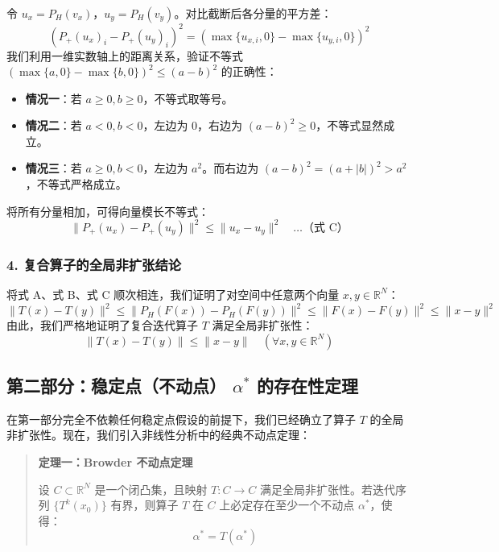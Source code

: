 令 $u_x = P_H(v_x)$，$u_y = P_H(v_y)$。对比截断后各分量的平方差：
\begin{equation}
(P_+(u_x)_i - P_+(u_y)_i)^2 = (\max\{u_{x,i}, 0\} - \max\{u_{y,i}, 0\})^2
\end{equation}
我们利用一维实数轴上的距离关系，验证不等式 $(\max\{a, 0\} - \max\{b, 0\})^2 \leqslant (a - b)^2$ 的正确性：

\begin{itemize}
\item \textbf{情况一}：若 $a \geqslant 0, b \geqslant 0$，不等式取等号。
\item \textbf{情况二}：若 $a < 0, b < 0$，左边为 $0$，右边为 $(a-b)^2 \geqslant 0$，不等式显然成立。
\item \textbf{情况三}：若 $a \geqslant 0, b < 0$，左边为 $a^2$。而右边为 $(a-b)^2 = (a+|b|)^2 > a^2$，不等式严格成立。
\end{itemize}

将所有分量相加，可得向量模长不等式：
\begin{equation}
\boxed{ \|P_+(u_x) - P_+(u_y)\|^2 \leqslant \|u_x - u_y\|^2 } \quad \dots \text{（式 C）}
\end{equation}

\subsubsection{4. 复合算子的全局非扩张结论}

将式 A、式 B、式 C 顺次相连，我们证明了对空间中任意两个向量 $x, y \in \mathbb{R}^N$：
\begin{equation}
\|T(x) - T(y)\|^2 \leqslant \|P_H(F(x)) - P_H(F(y))\|^2 \leqslant \|F(x) - F(y)\|^2 \leqslant \|x - y\|^2
\end{equation}
由此，我们严格地证明了复合迭代算子 $T$ 满足全局非扩张性：
\begin{equation}
\boxed{ \|T(x) - T(y)\| \leqslant \|x - y\| \quad (\forall x, y \in \mathbb{R}^N) }
\end{equation}

\subsection{第二部分：稳定点（不动点） $\alpha^*$ 的存在性定理}

在第一部分完全不依赖任何稳定点假设的前提下，我们已经确立了算子 $T$ 的全局非扩张性。现在，我们引入非线性分析中的经典不动点定理：

\begin{quote}
\textbf{定理一：Browder 不动点定理}

设 $C \subset \mathbb{R}^N$ 是一个闭凸集，且映射 $T: C \to C$ 满足全局非扩张性。若迭代序列 $\{T^k(x_0)\}$ 有界，则算子 $T$ 在 $C$ 上必定存在至少一个不动点 $\alpha^*$，使得：
\begin{equation}
\alpha^* = T(\alpha^*)
\end{equation}
\end{quote}

